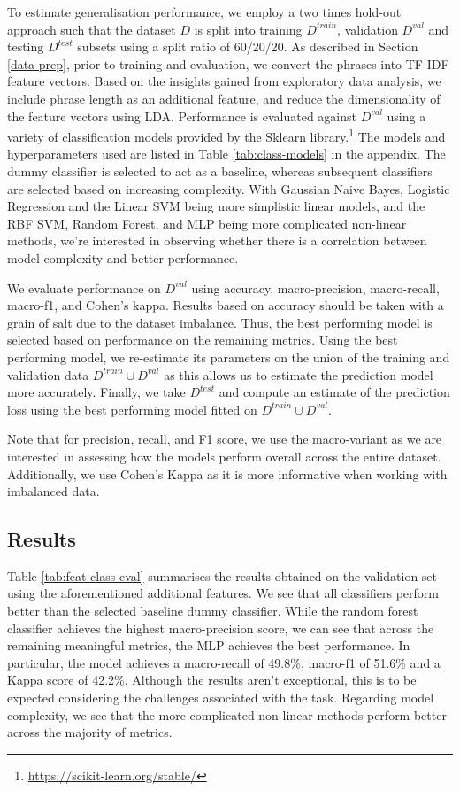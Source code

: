 \documentclass{article}
\begin{document}
To estimate generalisation performance, we employ a two times hold-out approach such that the dataset $D$ is split into training $D^{train}$, validation $D^{val}$ and testing $D^{test}$ subsets using a split ratio of 60/20/20. As described in Section \ref{data-prep}, prior to training and evaluation, we convert the phrases into TF-IDF feature vectors. Based on the insights gained from exploratory data analysis, we include phrase length as an additional feature, and reduce the dimensionality of the feature vectors using LDA. Performance is evaluated against $D^{val}$ using a variety of classification models provided by the Sklearn library.\footnote{\url{https://scikit-learn.org/stable/}} The models and hyperparameters used are listed in Table \ref{tab:class-models} in the appendix. The dummy classifier is selected to act as a baseline, whereas subsequent classifiers are selected based on increasing complexity. With Gaussian Naive Bayes, Logistic Regression and the Linear SVM being more simplistic linear models, and the RBF SVM, Random Forest, and MLP being more complicated non-linear methods, we're interested in observing whether there is a correlation between model complexity and better performance.

We evaluate performance on $D^{val}$ using accuracy, macro-precision, macro-recall, macro-f1, and Cohen's kappa. Results based on accuracy should be taken with a grain of salt due to the dataset imbalance. Thus, the best performing model is selected based on performance on the remaining metrics. Using the best performing model, we re-estimate its parameters on the union of the training and validation data $D^{train} \cup D^{val}$ as this allows us to estimate the prediction model more accurately. Finally, we take $D^{test}$ and compute an estimate of the prediction loss using the best performing model fitted on $D^{train} \cup D^{val}$.

Note that for precision, recall, and F1 score, we use the macro-variant as we are interested in assessing how the models perform overall across the entire dataset. Additionally, we use Cohen's Kappa as it is more informative when working with imbalanced data. 

\subsection{Results}

Table \ref{tab:feat-class-eval} summarises the results obtained on the validation set using the aforementioned additional features. We see that all classifiers perform better than the selected baseline dummy classifier. While the random forest classifier achieves the highest macro-precision score, we can see that across the remaining meaningful metrics, the MLP achieves the best performance. In particular, the model achieves a macro-recall of 49.8\%, macro-f1 of 51.6\% and a Kappa score of 42.2\%. Although the results aren't exceptional, this is to be expected considering the challenges associated with the task. Regarding model complexity, we see that the more complicated non-linear methods perform better across the majority of metrics. 
\end{document}
